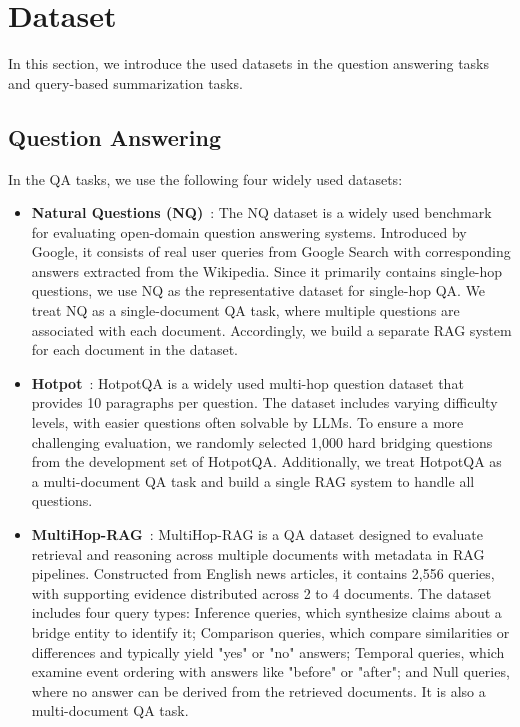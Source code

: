 \clearpage
\section{Dataset}
In this section, we introduce the used datasets in the question answering tasks and query-based summarization tasks.

\subsection{Question Answering}
\label{app:qa_dataset}
In the QA tasks, we use the following four widely used datasets:
\begin{itemize}[leftmargin=1em]
    \item \textbf{Natural Questions (NQ)}~\cite{kwiatkowski2019natural}: The NQ dataset is a widely used benchmark for evaluating open-domain question answering systems. Introduced by Google, it consists of real user queries from Google Search with corresponding answers extracted from the Wikipedia. Since it primarily contains single-hop questions, we use NQ as the representative dataset for single-hop QA. We treat NQ as a single-document QA task, where multiple questions are associated with each document. Accordingly, we build a separate RAG system for each document in the dataset.
    \item \textbf{Hotpot}~\cite{yang2018hotpotqa}: HotpotQA is a widely used multi-hop question dataset that provides 10 paragraphs per question. The dataset includes varying difficulty levels, with easier questions often solvable by LLMs. To ensure a more challenging evaluation, we randomly selected 1,000 hard bridging questions from the development set of HotpotQA. Additionally, we treat HotpotQA as a multi-document QA task and build a single RAG system to handle all questions.
    \item \textbf{MultiHop-RAG}~\cite{tang2024multihop}: MultiHop-RAG is a QA dataset designed to evaluate retrieval and reasoning across multiple documents with metadata in RAG pipelines. Constructed from English news articles, it contains 2,556 queries, with supporting evidence distributed across 2 to 4 documents. The dataset includes four query types: Inference queries, which synthesize claims about a bridge entity to identify it; Comparison queries, which compare similarities or differences and typically yield "yes" or "no" answers; Temporal queries, which examine event ordering with answers like "before" or "after"; and Null queries, where no answer can be derived from the retrieved documents. It is also a multi-document QA task.

\end{itemize}

